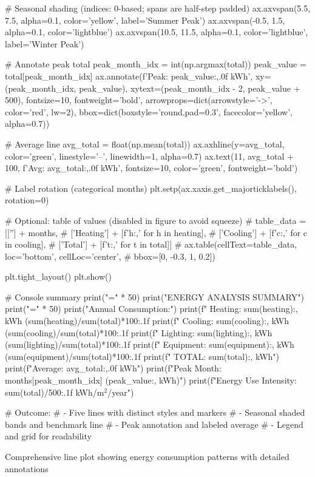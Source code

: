 {    # Seasonal shading (indices: 0-based; spans are half-step padded)
    ax.axvspan(5.5, 7.5, alpha=0.1, color='yellow', label='Summer Peak')
    ax.axvspan(-0.5, 1.5, alpha=0.1, color='lightblue')
    ax.axvspan(10.5, 11.5, alpha=0.1, color='lightblue', label='Winter Peak')

    # Annotate peak total
    peak_month_idx = int(np.argmax(total))
    peak_value = total[peak_month_idx]
    ax.annotate(f'Peak: {peak_value:,.0f} kWh',
                xy=(peak_month_idx, peak_value),
                xytext=(peak_month_idx - 2, peak_value + 500),
                fontsize=10, fontweight='bold',
                arrowprops=dict(arrowstyle='->', color='red', lw=2),
                bbox=dict(boxstyle='round,pad=0.3',
                          facecolor='yellow', alpha=0.7))

    # Average line
    avg_total = float(np.mean(total))
    ax.axhline(y=avg_total, color='green', linestyle='--', linewidth=1, alpha=0.7)
    ax.text(11, avg_total + 100, f'Avg: {avg_total:,.0f} kWh',
            fontsize=10, color='green', fontweight='bold')

    # Label rotation (categorical months)
    plt.setp(ax.xaxis.get_majorticklabels(), rotation=0)

    # Optional: table of values (disabled in figure to avoid squeeze)
    # table_data = [[''] + months,
    #               ['Heating'] + [f'{h:,}' for h in heating],
    #               ['Cooling'] + [f'{c:,}' for c in cooling],
    #               ['Total'] +   [f'{t:,}' for t in total]]
    # ax.table(cellText=table_data, loc='bottom', cellLoc='center',
    #          bbox=[0, -0.3, 1, 0.2])

    plt.tight_layout()
    plt.show()

    # Console summary
    print("=" * 50)
    print("ENERGY ANALYSIS SUMMARY")
    print("=" * 50)
    print("Annual Consumption:")
    print(f"  Heating:   {sum(heating):,} kWh ({sum(heating)/sum(total)*100:.1f}%
    print(f"  Cooling:   {sum(cooling):,} kWh ({sum(cooling)/sum(total)*100:.1f}%
    print(f"  Lighting:  {sum(lighting):,} kWh ({sum(lighting)/sum(total)*100:.1f}%
    print(f"  Equipment: {sum(equipment):,} kWh ({sum(equipment)/sum(total)*100:.1f}%
    print(f"  TOTAL:     {sum(total):,} kWh")
    print(f"\nMonthly Average: {avg_total:,.0f} kWh")
    print(f"Peak Month: {months[peak_month_idx]} ({peak_value:,} kWh)")
    print(f"Energy Use Intensity: {sum(total)/500:.1f} kWh/m$^2$/year")

    # Outcome:
    # - Five lines with distinct styles and markers
    # - Seasonal shaded bands and benchmark line
    # - Peak annotation and labeled average
    # - Legend and grid for readability
}{Comprehensive line plot showing energy consumption patterns with detailed annotations}

